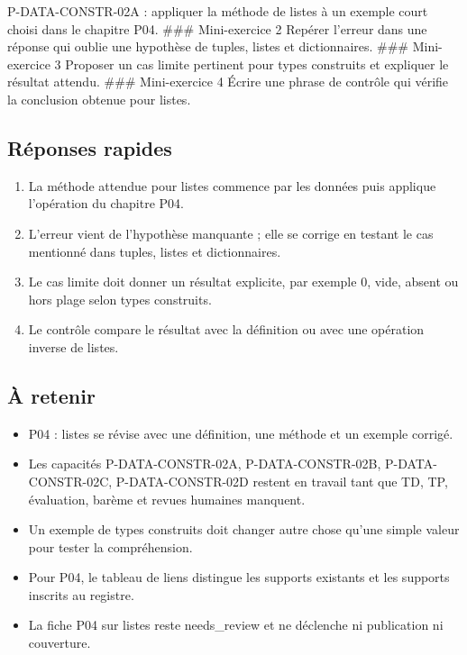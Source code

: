 P-DATA-CONSTR-02A : appliquer la méthode de listes à un exemple court
choisi dans le chapitre P04. \#\#\# Mini-exercice 2 Repérer l'erreur
dans une réponse qui oublie une hypothèse de tuples, listes et
dictionnaires. \#\#\# Mini-exercice 3 Proposer un cas limite pertinent
pour types construits et expliquer le résultat attendu. \#\#\#
Mini-exercice 4 Écrire une phrase de contrôle qui vérifie la conclusion
obtenue pour listes.

\subsection{Réponses rapides}

\begin{enumerate}
\def\labelenumi{\arabic{enumi}.}
\tightlist
\item
  La méthode attendue pour listes commence par les données puis applique
  l'opération du chapitre P04.
\item
  L'erreur vient de l'hypothèse manquante ; elle se corrige en testant
  le cas mentionné dans tuples, listes et dictionnaires.
\item
  Le cas limite doit donner un résultat explicite, par exemple 0, vide,
  absent ou hors plage selon types construits.
\item
  Le contrôle compare le résultat avec la définition ou avec une
  opération inverse de listes.
\end{enumerate}

\subsection{À retenir}

\begin{itemize}
\tightlist
\item
  P04 : listes se révise avec une définition, une méthode et un exemple
  corrigé.
\item
  Les capacités P-DATA-CONSTR-02A, P-DATA-CONSTR-02B, P-DATA-CONSTR-02C,
  P-DATA-CONSTR-02D restent en travail tant que TD, TP, évaluation,
  barème et revues humaines manquent.
\item
  Un exemple de types construits doit changer autre chose qu'une simple
  valeur pour tester la compréhension.
\item
  Pour P04, le tableau de liens distingue les supports existants et les
  supports inscrits au registre.
\item
  La fiche P04 sur listes reste needs\_review et ne déclenche ni
  publication ni couverture.
\end{itemize}

